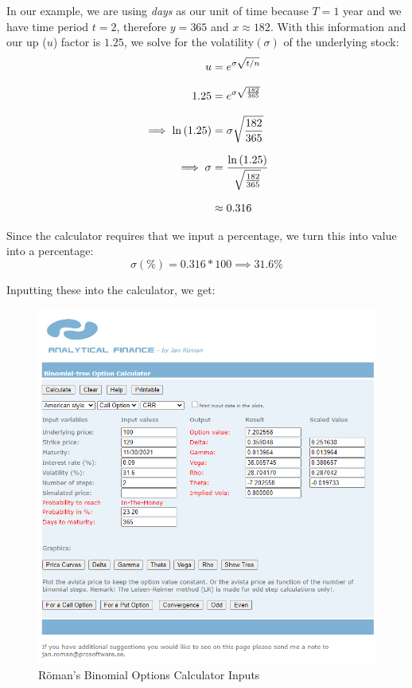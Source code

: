 \documentclass[12pt, letterpaper]{article}\usepackage{float}
\begin{document}
In our example, we are using \textit{days} as our unit of time because ${T=1}$ year and we have time period ${t=2}$, therefore ${y = 365}$ and ${x \approx 182}$. With this information and our up (${u}$) factor is ${1.25}$, we solve for the volatility${(\sigma)}$ of the underlying stock:
\begin{equation*}
  \setlength{\jot}{10pt}
  \begin{split}
    u
    & = e^{\sigma\sqrt{t/n}} \\
    1.25
    & = e^{\sigma\sqrt{\frac{182}{365}}} \\
    \implies \ln{(1.25)} &= \sigma\sqrt{\frac{182}{365}} \\
    \implies \sigma &= \frac{\ln{(1.25)}}{\sqrt{\frac{182}{365}}} \\
    & \approx 0.316
  \end{split}
\end{equation*}

Since the calculator requires that we input a percentage, we turn this into value into a percentage:
\begin{equation*}
    \sigma (\%) = 0.316 * 100 \implies 31.6\%
\end{equation*}

\pagebreak

\noindent Inputting these into the calculator, we get:
\begin{figure}[H]
  \includegraphics[scale=0.8]{Roman_binomial_calculator_inputs}
  \caption{R\"{o}man's Binomial Options Calculator Inputs}
\end{figure}
\end{document}
